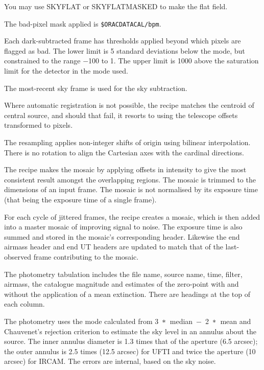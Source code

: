 \documentclass[twoside,11pt]{article}
\newcommand{\htmlref}[2]{#1}
\renewcommand{\_}{\texttt{\symbol{95}}}
\newcommand{\lsk}{\raisebox{-0.4ex}{\rm *}}
\newcommand{\sstitem}{\item}
\begin{document}
{{{         \sstitem
         You may use \htmlref{SKY\_FLAT}{SKY\_FLAT} or \htmlref{SKY\_FLAT\_MASKED}{SKY\_FLAT\_MASKED} to make the flat field.

         \sstitem
         The bad-pixel mask applied is {\tt\$ORAC\_DATA\_CAL/bpm}.

         \sstitem
         Each dark-subtracted frame has thresholds applied beyond which
         pixels are flagged as bad.  The lower limit is 5 standard
         deviations below the mode, but constrained to the range $-$100 to 1.
         The upper limit is 1000 above the saturation limit for the detector
         in the mode used.

         \sstitem
         The most-recent sky frame is used for the sky subtraction.

         \sstitem
         Where automatic registration is not possible, the recipe matches
         the centroid of central source, and should that fail, it resorts
         to using the telescope offsets transformed to pixels.

         \sstitem
         The resampling applies non-integer shifts of origin using
         bilinear interpolation.  There is no rotation to align the
         Cartesian axes with the cardinal directions.

         \sstitem
         The recipe makes the mosaic by applying offsets in intensity to
         give the most consistent result amongst the overlapping regions.
         The mosaic is trimmed to the dimensions of an input frame.  The
         mosaic is not normalised by its exposure time (that being the
         exposure time of a single frame).

         \sstitem
         For each cycle of jittered frames, the recipe creates a mosaic,
         which is then added into a master mosaic of improving signal to
         noise.  The exposure time is also summed and stored in the
	 mosaic's corresponding header.  Likewise the end airmass
	 header and end UT headers are updated to match that of the
	 last-observed frame contributing to the mosaic.

         \sstitem
         The photometry tabulation includes the file name, source
         name, time, filter, airmass, the catalogue magnitude and
         estimates of the zero-point with and without the application
         of a mean extinction.  There are headings at the top of each
         column.

         \sstitem
         The photometry uses the mode calculated from
         \mbox{3 $\lsk$ median $-$ 2 $\lsk$ mean} and Chauvenet's
         rejection criterion to estimate the sky level in an annulus
         about the source.  The inner annulus diameter is 1.3 times
         that of the aperture (6.5 arcsec); the outer annulus is 2.5
         times (12.5 arcsec) for UFTI and twice the aperture (10 arcsec)
         for IRCAM. The errors are internal, based on the sky noise.

}}}
\end{document}
